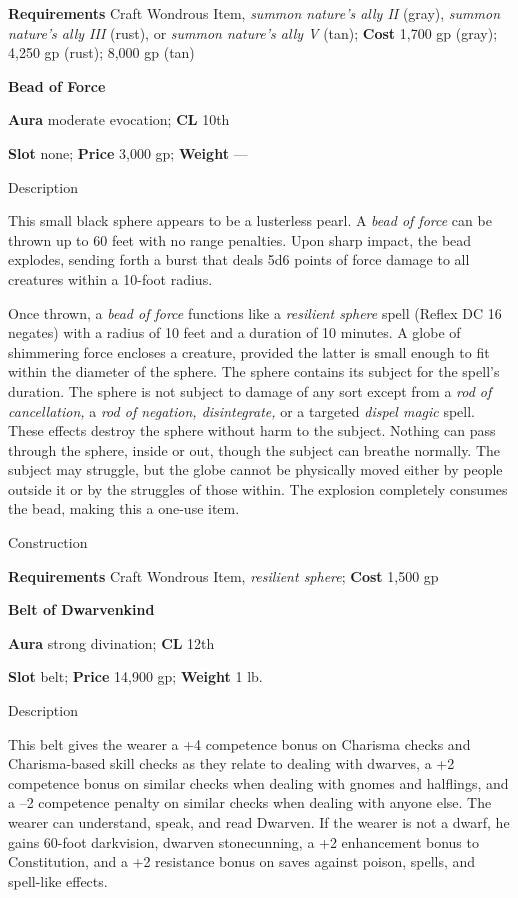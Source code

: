 \textbf{Requirements }Craft Wondrous Item, \textit{summon nature's ally II }(gray), \textit{summon nature's ally III }(rust), or \textit{summon nature's ally V} (tan); \textbf{Cost} 1,700 gp (gray); 4,250 gp (rust); 8,000 gp (tan)
				
\textbf{Bead of Force}
				
\textbf{Aura} moderate evocation;\textbf{ CL }10th
				
\textbf{Slot} none; \textbf{Price} 3,000 gp; \textbf{Weight} ---
				
Description
				
This small black sphere appears to be a lusterless pearl. A \textit{bead of force} can be thrown up to 60 feet with no range penalties. Upon sharp impact, the bead explodes, sending forth a burst that deals 5d6 points of force damage to all creatures within a 10-foot radius.
				
Once thrown, a \textit{bead of force} functions like a\textit{ resilient sphere }spell (Reflex DC 16 negates) with a radius of 10 feet and a duration of 10 minutes. A globe of shimmering force encloses a creature, provided the latter is small enough to fit within the diameter of the sphere. The sphere contains its subject for the spell's duration. The sphere is not subject to damage of any sort except from a \textit{rod of cancellation, }a \textit{rod of negation, disintegrate, }or a targeted \textit{dispel magic }spell. These effects destroy the sphere without harm to the subject. Nothing can pass through the sphere, inside or out, though the subject can breathe normally. The subject may struggle, but the globe cannot be physically moved either by people outside it or by the struggles of those within. The explosion completely consumes the bead, making this a one-use item. 
				
Construction
				
\textbf{Requirements} Craft Wondrous Item, \textit{resilient sphere}; \textbf{Cost }1,500 gp
				
\textbf{Belt of Dwarvenkind}
				
\textbf{Aura} strong divination;\textbf{ CL }12th
				
\textbf{Slot} belt; \textbf{Price} 14,900 gp; \textbf{Weight} 1 lb.
				
Description
				
This belt gives the wearer a +4 competence bonus on Charisma checks and Charisma-based skill checks as they relate to dealing with dwarves, a +2 competence bonus on similar checks when dealing with gnomes and halflings, and a --2 competence penalty on similar checks when dealing with anyone else. The wearer can understand, speak, and read Dwarven. If the wearer is not a dwarf, he gains 60-foot darkvision, dwarven stonecunning, a +2 enhancement bonus to Constitution, and a +2 resistance bonus on saves against poison, spells, and spell-like effects. 
				
